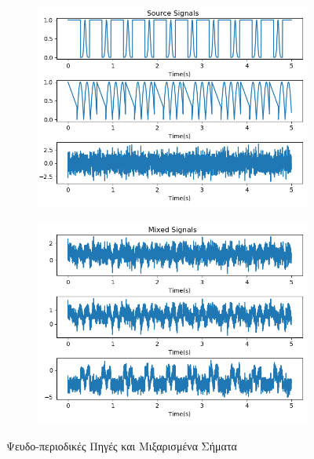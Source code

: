 \begin{figure}[H]
    \centering
    \begin{subfigure}{0.48 \textwidth}
        \centering
       \includegraphics[width=\textwidth]{fwto/source.png} \en
        \caption{} \gr
        \label{fig:5.7a}
    \end{subfigure}
    \hfill
    \begin{subfigure}{0.48 \textwidth}
        \centering
       \includegraphics[width=\textwidth]{fwto/mixed.png}
        \en
        \caption{} \gr
        \label{fig:5.7b}
    \end{subfigure}
    \gr
    \caption{Ψευδο-περιοδικές Πηγές και Μιξαρισμένα Σήματα}
\end{figure}

